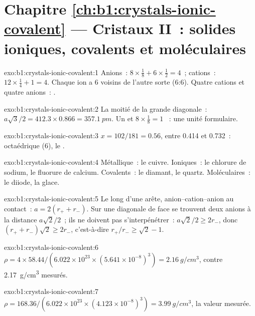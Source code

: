 \section*{Chapitre \ref{ch:b1:crystals-ionic-covalent} --- Cristaux II~: solides ioniques, covalents et moléculaires}

\begin{solution}{exo:b1:crystals-ionic-covalent:1}
Anions~: $8 \times \frac18 + 6 \times \frac12 = 4$~; cations~: $12 \times
\frac14 + 1 = 4$. Chaque ion a 6 voisins de l'autre sorte (6:6). Quatre
cations et quatre anions~: .
\end{solution}

\begin{solution}{exo:b1:crystals-ionic-covalent:2}
La moitié de la grande diagonale~: $a\sqrt3/2 = 412.3 \times 0.866 = \qty{357.1}{pm}$.
Un  et $8 \times \frac18 = 1$ ~: une unité formulaire.
\end{solution}

\begin{solution}{exo:b1:crystals-ionic-covalent:3}
$x = 102/181 = 0.56$, entre 0.414 et 0.732~:  octaédrique
(6), le .
\end{solution}

\begin{solution}{exo:b1:crystals-ionic-covalent:4}
Métallique~: le cuivre. Ioniques~: le chlorure de sodium, le fluorure de
calcium. Covalents~: le diamant, le quartz. Moléculaires~: le diiode, la
glace.
\end{solution}

\begin{solution}{exo:b1:crystals-ionic-covalent:5}
Le long d'une arête, anion--cation--anion au contact~: $a = 2(r_+ + r_-)$.
Sur une diagonale de face se trouvent deux anions à la distance
$a\sqrt2/2$~; ils ne doivent pas s'interpénétrer~: $a\sqrt2/2 \ge 2r_-$,
donc $(r_+ + r_-)\sqrt2 \ge 2r_-$, c'est-à-dire
$r_+/r_- \ge \sqrt2 - 1$.
\end{solution}

\begin{solution}{exo:b1:crystals-ionic-covalent:6}
$\rho = 4 \times 58.44/(6.022 \times 10^{23} \times (5.641 \times
10^{-8})^3) = \qty{2.16}{g/cm^3}$, contre \qty{2.17}{g/cm^3} mesurés.
\end{solution}

\begin{solution}{exo:b1:crystals-ionic-covalent:7}
$\rho = 168.36/(6.022 \times 10^{23} \times (4.123 \times 10^{-8})^3) =
\qty{3.99}{g/cm^3}$, la valeur mesurée.
\end{solution}

